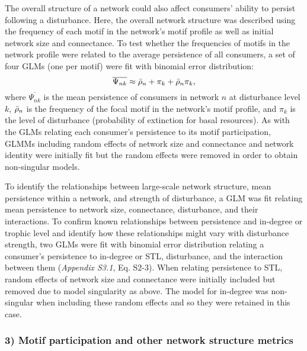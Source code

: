 \documentclass[12pt]{article}
\begin{document}
\begin{spacing}{2.0}
            The overall structure of a network could also affect consumers' ability to persist following a disturbance.
            Here, the overall network structure was described using the frequency of each motif in the network's motif profile as well as initial network size and connectance.
            To test whether the frequencies of motifs in the network profile were related to the average persistence of all consumers, a set of four GLMs  (one per motif) were fit with binomial error distribution:
                \begin{equation}
                    \overline{\Psi_{nk}} \approx \Bar{\rho}_{n} + \pi_{k} + \Bar{\rho}_{n}\pi_{k},
                    \label{netpropeq}
                \end{equation}
            \noindent where $\overline{\Psi_{nk}}$ is the mean persistence of consumers in network $n$ at disturbance level $k$, $\Bar{\rho}_{n}$ is the frequency of the focal motif in the network's motif profile, and $\pi_k$ is the level of disturbance (probability of extinction for basal resources).
            As with the GLMs relating each consumer's persistence to its motif participation, GLMMs including random effects of network size and connectance and network identity were initially fit but the random effects were removed in order to obtain non-singular models.


            To identify the relationships between large-scale network structure,  mean persistence within a network, and strength of disturbance, a GLM was fit relating mean persistence to network size, connectance, disturbance, and their interactions.
            To confirm known relationships between persistence and in-degree or trophic level and identify how these relationships might vary with disturbance strength, two GLMs were fit with binomial error distribution relating a consumer's persistence to in-degree or STL, disturbance, and the interaction between them (\emph{Appendix S3.1}, Eq. S2-3).
            When relating persistence to STL, random effects of network size and connectance were initially included but removed due to model singularity as above.
            The model for in-degree was non-singular when including these random effects and so they were retained in this case.



        \subsubsection*{3) Motif participation and other network structure metrics}


\end{spacing}
\end{document}
